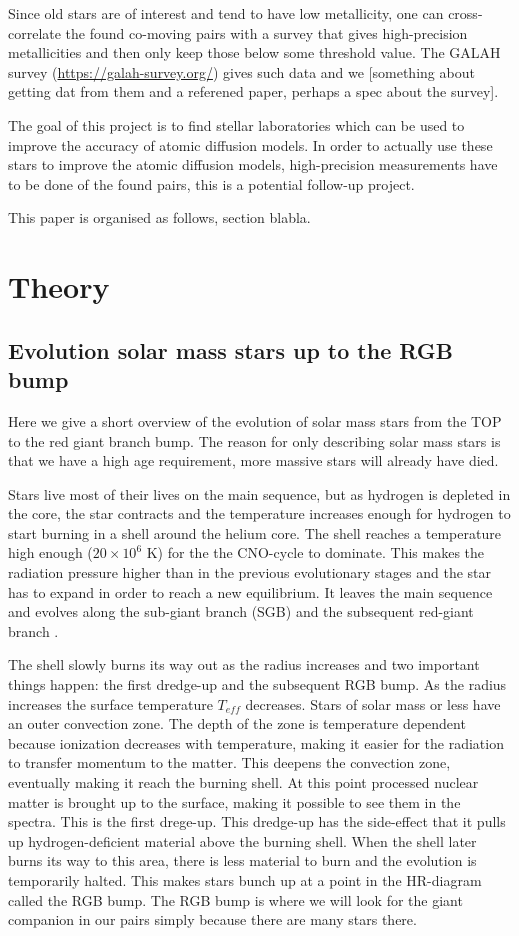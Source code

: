 \documentclass[twocolumn]{aastex62}
\begin{document}
Since old stars are of interest and tend to have low metallicity, one can cross-correlate the found co-moving pairs with a survey that gives  high-precision metallicities and then only keep those below some threshold value. The GALAH survey (\url{https://galah-survey.org/}) gives such data and we [something about getting dat from them and a referened paper, perhaps a spec about the survey].

The goal of this project is to find stellar laboratories which can be used to improve the accuracy of atomic diffusion models. In order to actually use these stars to improve the atomic diffusion models, high-precision measurements have to be done of the found pairs, this is a potential follow-up project.

This paper is organised as follows, section blabla.

\section{Theory}
\subsection{Evolution solar mass stars up to the RGB bump}
Here we give a short overview of the evolution of solar mass stars from the TOP to the red giant branch bump. The reason for only describing solar mass stars is that we have a high age requirement, more massive stars will already have died.

Stars live most of their lives on the main sequence, but as hydrogen is depleted in the core, the star contracts and the temperature increases enough for hydrogen to start burning in a shell around the helium core. The shell reaches a temperature high enough ($20\times10^6$ K) for the the CNO-cycle to dominate. This makes the radiation pressure higher than in the previous evolutionary stages and the star has to expand in order to reach a new equilibrium. It leaves the main sequence and evolves along the sub-giant branch (SGB) and the subsequent red-giant branch \citep{BV3_pp172_174}.

The shell slowly burns its way out as the radius increases and two important things happen: the first dredge-up and the subsequent RGB bump. As the radius increases the surface temperature $T_{eff}$ decreases. Stars of solar mass or less have an outer convection zone. The depth of the zone is temperature dependent because ionization decreases with temperature, making it easier for the radiation to transfer momentum to the matter. This deepens the convection zone, eventually making it reach the burning shell. At this point processed nuclear matter is brought up to the surface, making it possible to see them in the spectra. This is the first drege-up. This dredge-up has the side-effect that it pulls up hydrogen-deficient material above the burning shell. When the shell later burns its way to this area, there is less material to burn and the evolution is temporarily halted. This makes stars bunch up at a point in the HR-diagram called the RGB bump. The RGB bump is where we will look for the giant companion in our pairs simply because there are many stars there.
\end{document}
